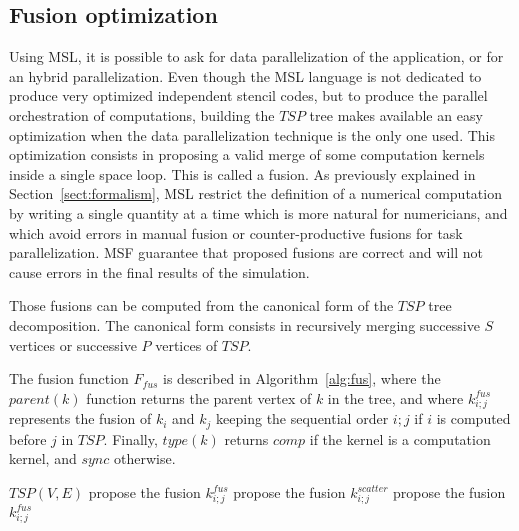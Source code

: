 \subsection{Fusion optimization}
\label{sect:fusion}

Using MSL, it is possible to ask for data parallelization of the application, or for an hybrid parallelization. Even though the MSL language is not dedicated to produce very optimized independent stencil codes, but to produce the parallel orchestration of computations, building the $TSP$ tree makes available an easy optimization when the data parallelization technique is the only one used. 
This optimization consists in proposing a valid merge of some computation kernels inside a single space loop. This is called a fusion. As previously explained in Section~\ref{sect:formalism}, MSL restrict the definition of a numerical computation by writing a single quantity at a time which is more natural for numericians, and which avoid errors in manual fusion or counter-productive fusions for task parallelization. MSF guarantee that proposed fusions are correct and will not cause errors in the final results of the simulation.

Those fusions can be computed from the canonical form of the $TSP$ tree decomposition. The canonical form consists in recursively merging successive $S$ vertices or successive $P$ vertices of $TSP$.

The fusion function $F_{fus}$ is described in Algorithm~\ref{alg:fus}, where the $parent(k)$ function returns the parent vertex of $k$ in the tree, and where $k_{i;j}^{fus}$ represents the fusion of $k_i$ and $k_j$ keeping the sequential order $i;j$ if $i$ is computed before $j$ in $TSP$. Finally, $type(k)$ returns $comp$ if the kernel is a computation kernel, and $sync$ otherwise.

\begin{algorithm}
\caption{$F_{fus}$}
\label{alg:fus}
\begin{algorithmic}[1]
 {$TSP(V,E)$}
\State propose the fusion $k_{i;j}^{fus}$
\Else
{}
\State propose the fusion $k_{i;j}^{scatter}$
\EndIf
\EndIf
{}
\State propose the fusion $k_{i;j}^{fus}$
\EndIf
\EndIf
\EndIf
\EndIf
\EndFor
\EndProcedure
\end{algorithmic}
\end{algorithm}


